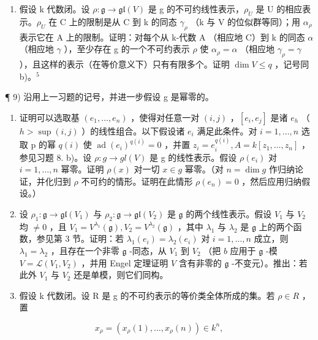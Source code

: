 \begin{enumerate}
\def\labelenumi{\alph{enumi})}
\setcounter{enumi}{3}
\tightlist
\item
  假设 k 代数闭。设 \(\rho: \mathfrak{g} \to \mathfrak{gl}(V)\) 是 g 的不可约线性表示，\(\rho_{U}\) 是 U 的相应表示。\(\rho_{U}\) 在 C 上的限制是从 C 到 k 的同态 \(\gamma_{\rho}\) （k 与 V 的位似群等同）；用 \(\alpha_{\rho}\) 表示它在 A 上的限制。证明：对每个从 k-代数 A （相应地 C）到 k 的同态 \(\alpha\) （相应地 \(\gamma\) ），至少存在 g 的一个不可约表示 \(\rho\) 使 \(\alpha_{\rho} = \alpha\) （相应地 \(\gamma_{\rho} = \gamma\) ），且这样的表示（在等价意义下）只有有限多个。证明 \(\dim V \leq q\) ，记号同 b)。\(^{5}\)
\end{enumerate}

¶ 9) 沿用上一习题的记号，并进一步假设 g 是幂零的。

\begin{enumerate}
\def\labelenumi{\alph{enumi})}
\item
  证明可以选取基 \((e_{1},\ldots,e_{n})\) ，使得对任意一对 \((i,j)\) ，\([e_{i},e_{j}]\) 是诸 \(e_{h}\) （ \(h > \sup(i,j)\) ）的线性组合。以下假设诸 \(e_{i}\) 满足此条件。对 \(i=1,\ldots,n\) 选取 p 的幂 \(q(i)\) 使 \(\operatorname{ad}(e_{i})^{q(i)} = 0\) ，并置 \(z_{i} = e_{i}^{q(i)}, A = k[z_{1},\ldots,z_{n}]\) ，参见习题 8. b)。设 \(\rho : g \to gl(V)\) 是 g 的线性表示。假设 \(\rho(e_{i})\) 对 \(i = 1,\ldots,n\) 幂零。证明 \(\rho(x)\) 对一切 \(x \in g\) 幂零。（对 \(n = \dim g\) 作归纳论证，并化归到 \(\rho\) 不可约的情形。证明在此情形 \(\rho(e_{n}) = 0\) ，然后应用归纳假设。）
\item
  设 \(\rho_1: \mathfrak{g} \to \mathfrak{gl}(V_1)\) 与 \(\rho_2: \mathfrak{g} \to \mathfrak{gl}(V_2)\) 是 \(\mathfrak{g}\) 的两个线性表示。假设 \(V_1\) 与 \(V_2\) 均 \(\neq 0\) ，且 \(V_1 = V^{\lambda_1}(\mathfrak{g}), V_2 = V^{\lambda_2}(\mathfrak{g})\) ，其中 \(\lambda_1\) 与 \(\lambda_2\) 是 \(\mathfrak{g}\) 上的两个函数，参见第 3 节。证明：若 \(\lambda_1(e_i) = \lambda_2(e_i)\) 对 \(i = 1, \ldots, n\) 成立，则 \(\lambda_1 = \lambda_2\) ，且存在一个非零 \(\mathfrak{g}\) -同态，从 \(V_1\) 到 \(V_2\) （把 \(b\) 应用于 \(\mathfrak{g}\) -模 \(V = \mathcal{L}(V_1, V_2)\) ，并用 Engel 定理证明 \(V\) 含有非零的 \(\mathfrak{g}\) -不变元）。推出：若此外 \(V_1\) 与 \(V_2\) 还是单模，则它们同构。
\item
  假设 k 代数闭。设 R 是 g 的不可约表示的等价类全体所成的集。若 \(\rho \in R\) ，置
\end{enumerate}

\[
x _ {\rho} = (x _ {\rho} (1), \dots , x _ {\rho} (n)) \in k ^ {n},
\]


